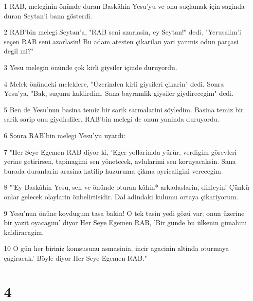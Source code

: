 \par 1 RAB, meleginin önünde duran Baskâhin Yesu'yu ve onu suçlamak için saginda duran Seytan'i bana gösterdi.
\par 2 RAB'bin melegi Seytan'a, "RAB seni azarlasin, ey Seytan!" dedi, "Yerusalim'i seçen RAB seni azarlasin! Bu adam atesten çikarilan yari yanmis odun parçasi degil mi?"
\par 3 Yesu melegin önünde çok kirli giysiler içinde duruyordu.
\par 4 Melek önündeki meleklere, "Üzerinden kirli giysileri çikarin" dedi. Sonra Yesu'ya, "Bak, suçunu kaldirdim. Sana bayramlik giysiler giydirecegim" dedi.
\par 5 Ben de Yesu'nun basina temiz bir sarik sarmalarini söyledim. Basina temiz bir sarik sarip onu giydirdiler. RAB'bin melegi de onun yaninda duruyordu.
\par 6 Sonra RAB'bin melegi Yesu'yu uyardi:
\par 7 "Her Seye Egemen RAB diyor ki, 'Eger yollarimda yürür, verdigim görevleri yerine getirirsen, tapinagimi sen yönetecek, avlularimi sen koruyacaksin. Sana burada duranlarin arasina katilip huzuruma çikma ayricaligini verecegim.
\par 8 "'Ey Baskâhin Yesu, sen ve önünde oturan kâhin* arkadaslarin, dinleyin! Çünkü onlar gelecek olaylarin önbelirtisidir. Dal adindaki kulumu ortaya çikariyorum.
\par 9 Yesu'nun önüne koydugum tasa bakin! O tek tasin yedi gözü var; onun üzerine bir yazit oyacagim' diyor Her Seye Egemen RAB, 'Bir günde bu ülkenin günahini kaldiracagim.
\par 10 O gün her biriniz komsusunu asmasinin, incir agacinin altinda oturmaya çagiracak.' Böyle diyor Her Seye Egemen RAB."

\chapter{4}

